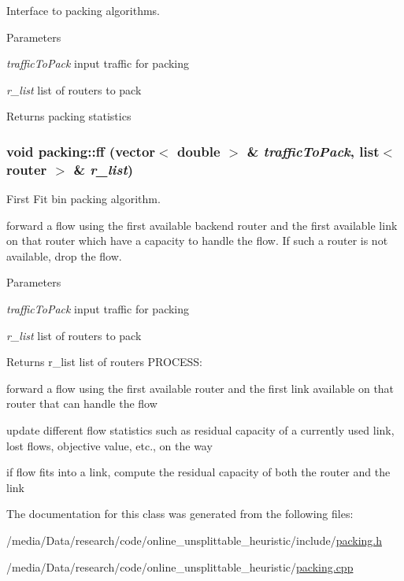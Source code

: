 Interface to packing algorithms. 


\begin{DoxyParams}{Parameters}
\item[{\em trafficToPack}]input traffic for packing \item[{\em r\_\-list}]list of routers to pack \end{DoxyParams}
\begin{DoxyReturn}{Returns}
packing statistics 
\end{DoxyReturn}
\hypertarget{classpacking_acd308605e21d05122f19b6673f7496a2}{
\subsubsection[{ff}]{\setlength{\rightskip}{0pt plus 5cm}void packing::ff (vector$<$ double $>$ \& {\em trafficToPack}, \/  list$<$ {\bf router} $>$ \& {\em r\_\-list})}}
\label{classpacking_acd308605e21d05122f19b6673f7496a2}


First Fit bin packing algorithm. 

forward a flow using the first available backend router and the first available link on that router which have a capacity to handle the flow. If such a router is not available, drop the flow. 
\begin{DoxyParams}{Parameters}
\item[{\em trafficToPack}]input traffic for packing \item[{\em r\_\-list}]list of routers to pack \end{DoxyParams}
\begin{DoxyReturn}{Returns}
r\_\-list list of routers PROCESS:
\begin{DoxyItemize}
\item forward a flow using the first available router and the first link available on that router that can handle the flow
\item update different flow statistics such as residual capacity of a currently used link, lost flows, objective value, etc., on the way 
\end{DoxyItemize}
\end{DoxyReturn}


if flow fits into a link, compute the residual capacity of both the router and the link 



The documentation for this class was generated from the following files:\begin{DoxyCompactItemize}
\item 
/media/Data/research/code/online\_\-unsplittable\_\-heuristic/include/\hyperlink{packing_8h}{packing.h}\item 
/media/Data/research/code/online\_\-unsplittable\_\-heuristic/\hyperlink{packing_8cpp}{packing.cpp}\end{DoxyCompactItemize}
